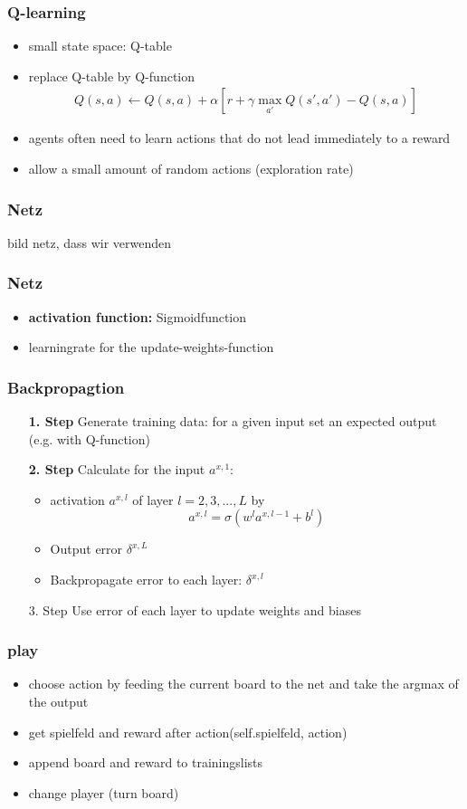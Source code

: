 \documentclass{beamer}
\begin{document}
  \begin{frame}
  \frametitle{Q-learning}
 \begin{itemize}
 \item small state space: Q-table
  \item replace Q-table by Q-function 
  \begin{align}
  Q(s,a) \leftarrow Q(s,a)+\alpha [r+\gamma \max_{a'} Q(s',a') -Q(s,a)]
  \end{align}
 \item agents often need to learn actions that do not lead immediately to a reward
 \item allow a small amount of random actions (exploration rate)
 \end{itemize}
 \end{frame}
 
 \begin{frame}
 \frametitle{Netz}
 bild netz, dass wir verwenden
 \end{frame}
  \begin{frame}
 \frametitle{Netz}
\begin{itemize}
\item \textbf{activation function:} Sigmoidfunction
\item learningrate for the update-weights-function
\end{itemize}
 \end{frame}
 
 \begin{frame}
 \frametitle{Backpropagtion}
 \begin{itemize}
 \item[\textbf{1. Step}] Generate training data: for a given input set an expected output (e.g. with Q-function)
 \item[\textbf{2. Step}] Calculate for the input $a^{x,1}$:
 \begin{itemize}
 \item activation $a^{x,l}$ of layer $l=2,3,...,L$ by
 $$a^{x,l} = \sigma(w^l a^{x,l-1} + b^l)$$
 \item Output error $\delta^{x,L}$
 \item Backpropagate error to each layer: $\delta^{x,l}$
 \end{itemize}
 \item[3. Step] Use error of each layer to update weights and biases 
 \end{itemize}
 \end{frame}
 
 \begin{frame}
 \frametitle{play}
 \begin{itemize}
\item choose action by feeding the current board to the net and take the argmax of the output
\item get spielfeld and reward after action(self.spielfeld, action)
\item append board and reward to trainingslists
\item change player (turn board)
\end{itemize}
 \end{frame}
 
\end{document}
